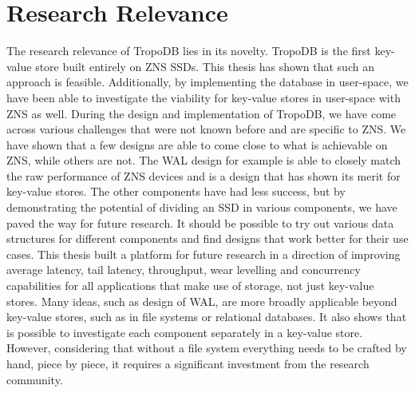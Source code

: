 \section{Research Relevance}
The research relevance of TropoDB lies in its novelty. TropoDB is the first key-value store built entirely on ZNS SSDs. This thesis has shown that such an approach is feasible. Additionally, by implementing the database in user-space, we have been able to investigate the viability for key-value stores in user-space with ZNS as well. During the design and implementation of TropoDB, we have come across various challenges that were not known before and are specific to ZNS. We have shown that a few designs are able to come close to what is achievable on ZNS, while others are not. The WAL design for example is able to closely match the raw performance of ZNS devices and is a design that has shown its merit for key-value stores. The other components have had less success, but by demonstrating the potential of dividing an SSD in various components, we have paved the way for future research. It should be possible to try out various data structures for different components and find designs that work better for their use cases. This thesis built a platform for future research in a direction of  improving average latency, tail latency, throughput, wear levelling and concurrency capabilities for all applications that make use of storage, not just key-value stores. Many ideas, such as design of WAL, are more broadly applicable beyond key-value stores, such as in file systems or relational databases. It also shows that is possible to investigate each component separately in a key-value store. However, considering that without a file system everything needs to be crafted by hand, piece by piece, it requires a significant investment from the research community. 

